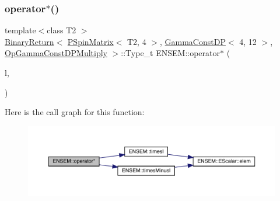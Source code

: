 \subsubsection{\texorpdfstring{operator$\ast$()}{operator*()}\hspace{0.1cm}{\footnotesize\ttfamily [61/64]}}
{\footnotesize\ttfamily template$<$class T2 $>$ \\
\mbox{\hyperlink{structENSEM_1_1BinaryReturn}{Binary\+Return}}$<$ \mbox{\hyperlink{classENSEM_1_1PSpinMatrix}{P\+Spin\+Matrix}}$<$ T2, 4 $>$, \mbox{\hyperlink{classENSEM_1_1GammaConstDP}{Gamma\+Const\+DP}}$<$ 4, 12 $>$, \mbox{\hyperlink{structENSEM_1_1OpGammaConstDPMultiply}{Op\+Gamma\+Const\+D\+P\+Multiply}} $>$\+::Type\+\_\+t E\+N\+S\+E\+M\+::operator$\ast$ (\begin{DoxyParamCaption}\item[{const \mbox{\hyperlink{classENSEM_1_1PSpinMatrix}{P\+Spin\+Matrix}}$<$ T2, 4 $>$ \&}]{l,  }\item[{const \mbox{\hyperlink{classENSEM_1_1GammaConstDP}{Gamma\+Const\+DP}}$<$ 4, 12 $>$ \&}]{ }\end{DoxyParamCaption})\hspace{0.3cm}{\ttfamily [inline]}}

Here is the call graph for this function\+:\nopagebreak
\begin{figure}[H]
\begin{center}
\leavevmode
\includegraphics[width=350pt]{d6/df5/group__primspinmatrix_ga554a403dc2f232b906a5f7a9971eced3_cgraph}
\end{center}
\end{figure}
\mbox{\label{group__primspinmatrix_ga1b7bc726f48b4c37350818e1d825d16d}} 
